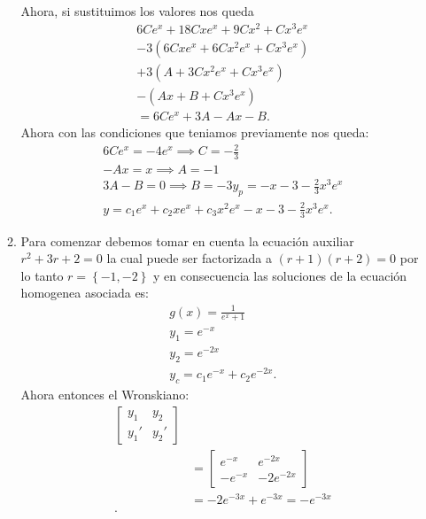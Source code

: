 \begin{enumerate}
\begin{enumerate}
	  Ahora, si sustituimos los valores nos queda
	  \begin{align*}
	    6Ce^{x} + 18Cxe^{x} + 9Cx^{2}+Cx^{3}e^{x}\\
	    -3\left( 6Cxe^{x}+6Cx^{2}e^{x}+Cx^{3}e^{x} \right) \\
	    +3 \left( A + 3Cx^2e^{x}+Cx^{3}e^{x} \right) \\
	    -\left( Ax+B+Cx^{3}e^{x} \right) \\
	    = 6Ce^{x}+3A - Ax- B
	  .\end{align*}
	  Ahora con las condiciones que teniamos previamente nos queda:
	  \begin{align*}
	    6Ce^{x}=-4e^{x} \implies C = -\frac{2}{3}\\
	    -Ax = x \implies A = -1\\
	    3A-B = 0 \implies B = -3
	    y_p = -x - 3 - \frac{2}{3}x^{3}e^{x}\\
	    y = c_1e^{x}+c_2xe^{x}+c_3x^{2}e^{x}-x - 3 - \frac{2}{3}x^{3}e^{x}
	  .\end{align*}
	  \item Para comenzar debemos tomar en cuenta la ecuación auxiliar $r^2+3r+2=0$ la cual puede ser factorizada a $\left( r+1 \right) \left( r+2 \right)=0$ por lo tanto $r=\left\{ -1,-2 \right\} $ y en consecuencia las soluciones de la ecuación homogenea asociada es:
	    \begin{align*}
	      g\left( x \right) = \frac{1}{e^{x}+1}\\
	      y_1 = e^{-x}\\
	      y_2 = e^{-2x}\\
	      y_c = c_1e^{-x}+c_2e^{-2x}
	    .\end{align*}
	    Ahora entonces el Wronskiano:
	    \begin{align*}
	      \begin{bmatrix} y_1 & y_2 \\ y_1' & y_2' \end{bmatrix} \\
				  &= \begin{bmatrix} e^{-x} & e^{-2x} \\ -e^{-x} & -2e^{-2x} \end{bmatrix}  \\
				  &= -2e^{-3x} + e^{-3x} = -e^{-3x} \\
	    .\end{align*}


\end{enumerate}
\end{enumerate}
